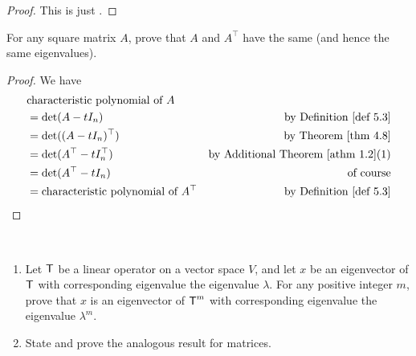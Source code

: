 \begin{proof}
This is just .
\end{proof}

\begin{exercise} \label{exercise 5.1.15}
For any square matrix \(A\), prove that \(A\) and \(A^\top\) have the same \CPOLY{} (and hence the same eigenvalues).
\end{exercise}

\begin{proof}
We have
\begin{align*}
    & \text{\CPOLY{} of \(A\)} \\
    & = \det(A - tI_n) & \text{by \DEF{5.3}} \\
    & = \det((A - tI_n)^\top) & \text{by \THM{4.8}} \\
    & = \det(A^\top - tI_n^\top) & \text{by \ATHM{1.2}(1)} \\
    & = \det(A^\top - tI_n) & \text{of course} \\
    & = \text{\CPOLY{} of \(A^\top\)} & \text{by \DEF{5.3}}
\end{align*}
\end{proof}

\begin{exercise} \label{exercise 5.1.16} \ 

\begin{enumerate}
\item Let \(\textsf{T}\) be a linear operator on a vector space \(V\), and let \(x\) be an eigenvector of \(\textsf{T}\) with corresponding eigenvalue the eigenvalue \(\lambda\).
For any positive integer \(m\), prove that \(x\) is an eigenvector of \(\textsf{T}^m\) with corresponding eigenvalue the eigenvalue \(\lambda^m\).
\item State and prove the analogous result for matrices.
\end{enumerate}
\end{exercise}

